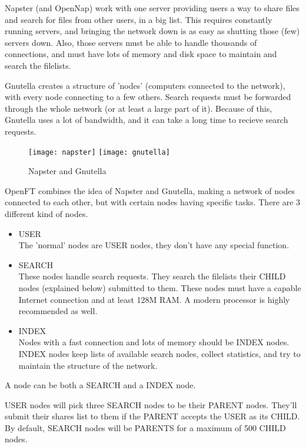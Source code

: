 \documentclass[10pt]{article}
\begin{document}
Napster (and OpenNap) work with one server providing users a way to share files
and search for files from other users, in a big list. This requires constantly
running servers, and bringing the network down is as easy as shutting those
(few) servers down. Also, those servers must be able to handle thousands
of connections, and must have lots of memory and disk space to maintain and
search the filelists.

Gnutella creates a structure of 'nodes' (computers connected to the network),
with every node connecting to a few others. Search requests must be forwarded
through the whole network (or at least a large part of it). Because of this,
Gnutella uses a lot of bandwidth, and it can take a long time to recieve search
requests.

\begin{figure}[bh]
  \begin{center}
    \texttt{[image: napster]}
    \texttt{[image: gnutella]}
  \end{center}
  \caption{Napster and Gnutella}
\end{figure}

OpenFT combines the idea of Napster and Gnutella, making a network of nodes
connected to each other, but with certain nodes having specific tasks. There are
3 different kind of nodes.
\begin{itemize}
\item{USER}\\
The 'normal' nodes are USER nodes, they don't have any special function.
\item{SEARCH}\\
These nodes handle search requests. They search the filelists their CHILD
nodes (explained below) submitted to them. These nodes must have a capable
Internet connection and at least 128M RAM.  A modern processor is highly
recommended as well.
\item{INDEX}\\
Nodes with a fast connection and lots of memory should be INDEX nodes. INDEX
nodes keep lists of available search nodes, collect statistics, and try to
maintain the structure of the network.
\end{itemize}

A node can be both a SEARCH and a INDEX node.

USER nodes will pick three SEARCH nodes to be their PARENT nodes. They'll
submit their shares list to them if the PARENT accepts the USER as its CHILD.
By default, SEARCH nodes will be PARENTS for a maximum of 500 CHILD nodes.
\end{document}
